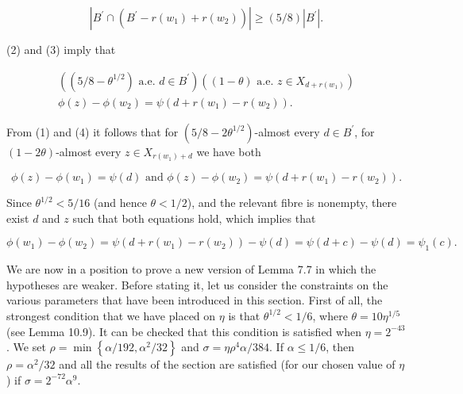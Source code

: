 \documentclass[10pt]{article}
\begin{document}
\begin{equation*}
\left|B^{\prime} \cap\left(B^{\prime}-r\left(w_{1}\right)+r\left(w_{2}\right)\right)\right| \geqslant(5 / 8)\left|B^{\prime}\right| . \tag{3}
\end{equation*}


(2) and (3) imply that


\begin{gather*}
\left((5/8-\theta^{1/2}) \text { a.e. } d \in B^{\prime}\right)\left((1-\theta) \text { a.e. } z \in X_{d+r\left(w_{1}\right)}\right)  \tag{4}\\
\phi(z)-\phi\left(w_{2}\right)=\psi\left(d+r\left(w_{1}\right)-r\left(w_{2}\right)\right) .
\end{gather*}


From (1) and (4) it follows that for $(5/8-2\theta^{1/2})$-almost every $d \in B^{\prime}$, for $(1-2\theta)$-almost every $z \in X_{r\left(w_{1}\right)+d}$ we have both

$$
\phi(z)-\phi\left(w_{1}\right)=\psi(d) \text { and } \phi(z)-\phi\left(w_{2}\right)=\psi\left(d+r\left(w_{1}\right)-r\left(w_{2}\right)\right) .
$$

Since $\theta^{1/2}<5/16$ (and hence $\theta<1/2$), and the relevant fibre is nonempty, there exist $d$ and $z$ such that both equations hold, which implies that

$$
\phi\left(w_{1}\right)-\phi\left(w_{2}\right)=\psi\left(d+r\left(w_{1}\right)-r\left(w_{2}\right)\right)-\psi(d)=\psi(d+c)-\psi(d)=\psi_{1}(c) .
$$

We are now in a position to prove a new version of Lemma 7.7 in which the hypotheses are weaker. Before stating it, let us consider the constraints on the various parameters that have been introduced in this section. First of all, the strongest condition that we have placed on $\eta$ is that $\theta^{1 / 2}<1 / 6$, where $\theta=10 \eta^{1 / 5}$ (see Lemma 10.9). It can be checked that this condition is satisfied when $\eta=2^{-43}$. We set $\rho=\min \left\{\alpha / 192, \alpha^{2} / 32\right\}$ and $\sigma=\eta \rho^{4} \alpha / 384$. If $\alpha \leqslant 1 / 6$, then $\rho=\alpha^{2} / 32$ and all the results of the section are satisfied (for our chosen value of $\eta$ ) if $\sigma=2^{-72} \alpha^{9}$.
\end{document}
